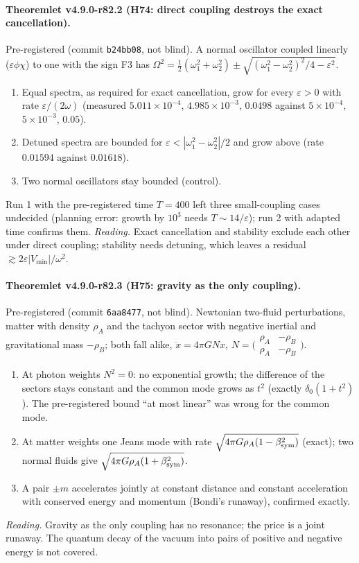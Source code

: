 \paragraph{Theoremlet v4.9.0-r82.2 (H74: direct coupling destroys the exact cancellation).}
Pre-registered (commit \texttt{b24bb08}, not blind).  A normal oscillator coupled linearly (\(\varepsilon\phi\chi\)) to one with the sign
F3 has \(\Omega^2=\tfrac12(\omega_1^2+\omega_2^2)\pm\sqrt{(\omega_1^2-\omega_2^2)^2/4-\varepsilon^2}\).
\begin{enumerate}[leftmargin=2em]
\item[(a)] Equal spectra, as required for exact cancellation, grow for every \(\varepsilon>0\) with rate \(\varepsilon/(2\omega)\) (measured
\(5.011\times10^{-4}\), \(4.985\times10^{-3}\), \(0.0498\) against \(5\times10^{-4}\), \(5\times10^{-3}\), \(0.05\)).
\item[(b)] Detuned spectra are bounded for \(\varepsilon<|\omega_1^2-\omega_2^2|/2\) and grow above (rate \(0.01594\) against \(0.01618\)).
\item[(c)] Two normal oscillators stay bounded (control).
\end{enumerate}
Run 1 with the pre-registered time \(T=400\) left three small-coupling cases undecided (planning error: growth by \(10^3\) needs
\(T\sim14/\varepsilon\)); run 2 with adapted time confirms them.  \emph{Reading.}  Exact cancellation and stability exclude each other
under direct coupling; stability needs detuning, which leaves a residual \(\gtrsim2\varepsilon|V_{\min}|/\omega^2\).

\paragraph{Theoremlet v4.9.0-r82.3 (H75: gravity as the only coupling).}
Pre-registered (commit \texttt{6aa8477}, not blind).  Newtonian two-fluid perturbations, matter with density \(\rho_A\) and the tachyon
sector with negative inertial and gravitational mass \(-\rho_B\); both fall alike, \(\ddot x=4\pi G N x\),
\(N=\bigl(\begin{smallmatrix}\rho_A&-\rho_B\\\rho_A&-\rho_B\end{smallmatrix}\bigr)\).
\begin{enumerate}[leftmargin=2em]
\item[(a)] At photon weights \(N^2=0\): no exponential growth; the difference of the sectors stays constant and the common mode grows
as \(t^2\) (exactly \(\delta_0(1+t^2)\)).  The pre-registered bound ``at most linear'' was wrong for the common mode.
\item[(b)] At matter weights one Jeans mode with rate \(\sqrt{4\pi G\rho_A(1-\beta_{\mathrm{sym}}^2)}\) (exact); two normal fluids give
\(\sqrt{4\pi G\rho_A(1+\beta_{\mathrm{sym}}^2)}\).
\item[(c)] A pair \(\pm m\) accelerates jointly at constant distance and constant acceleration with conserved energy and momentum
(Bondi's runaway), confirmed exactly.
\end{enumerate}
\emph{Reading.}  Gravity as the only coupling has no resonance; the price is a joint runaway.  The quantum decay of the vacuum into
pairs of positive and negative energy is not covered.

